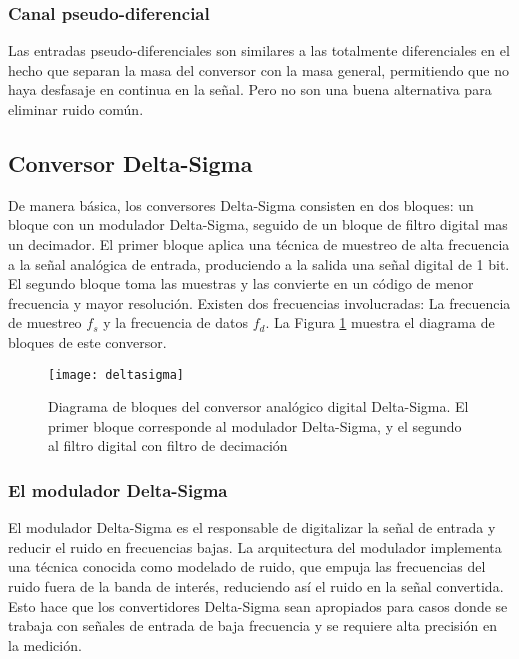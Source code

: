 
\subsubsection{Canal pseudo-diferencial}
\label{subs:canal_pseudo_diferencial}

Las entradas pseudo-diferenciales son similares a las totalmente diferenciales en el hecho que separan la masa del conversor con la masa general, permitiendo que no haya desfasaje en continua en la señal. Pero no son una buena alternativa para eliminar ruido común.\cite{tipos_canales}



\subsection{Conversor Delta-Sigma} %
\label{sub:conversor_delta_sigma}

De manera básica, los conversores Delta-Sigma consisten en dos bloques: un bloque con un modulador Delta-Sigma, seguido de un bloque de filtro digital mas un decimador. El primer bloque aplica una técnica de muestreo de alta frecuencia a la señal analógica de entrada, produciendo a la salida una señal digital de 1 bit. El segundo bloque toma las muestras y las convierte en un código de menor frecuencia y mayor resolución. Existen dos frecuencias involucradas: La frecuencia de muestreo $f_s$ y la frecuencia de datos $f_d$. La Figura \ref{fig:deltasigma} muestra el diagrama de bloques de este conversor.\cite{delta_sigma_1}

\begin{figure}[h]
  \centering
  \texttt{[image: deltasigma]}
  \caption{Diagrama de bloques del conversor analógico digital Delta-Sigma. El primer bloque corresponde al modulador Delta-Sigma, y el segundo al filtro digital con filtro de decimación}\label{fig:deltasigma}
\end{figure}

\subsubsection{El modulador Delta-Sigma} %
\label{ssub:el_modulador_delta_sigma}

El modulador Delta-Sigma es el responsable de digitalizar la señal de entrada y reducir el ruido en frecuencias bajas. La arquitectura del modulador implementa una técnica conocida como modelado de ruido, que empuja las frecuencias del ruido fuera de la banda de interés, reduciendo así el ruido en la señal convertida. Esto hace que los convertidores Delta-Sigma sean apropiados para casos donde se trabaja con señales de entrada de baja frecuencia y se requiere alta precisión en la medición. \\

